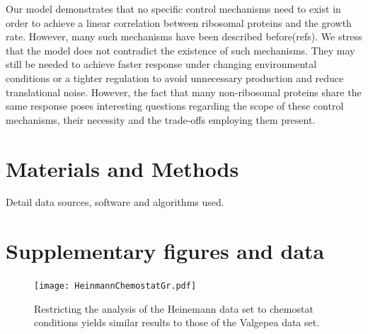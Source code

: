 \documentclass[notitlepage]{article}
\begin{document}
Our model demonstrates that no specific control mechanisms need to exist in order to achieve a linear correlation between ribosomal proteins and the growth rate.
However, many such mechanisms have been described before(refs).
We stress that the model does not contradict the existence of such mechanisms.
They may still be needed to achieve faster response under changing environmental conditions or a tighter regulation to avoid unnecessary production and reduce translational noise.
However, the fact that many non-ribosomal proteins share the same response poses interesting questions regarding the scope of these control mechanisms, their necessity and the trade-offs employing them present.

\section{Materials and Methods}
Detail data sources, software and algorithms used.

\section{Supplementary figures and data}
\begin{figure}[h]
\centering
\texttt{[image: HeinmannChemostatGr.pdf]}
\caption{
  Restricting the analysis of the Heinemann data set to chemostat conditions yields similar results to those of the Valgepea data set.
}
\label{fig:growthcorrchemo}
\end{figure}

\printbibliography
\end{document}
